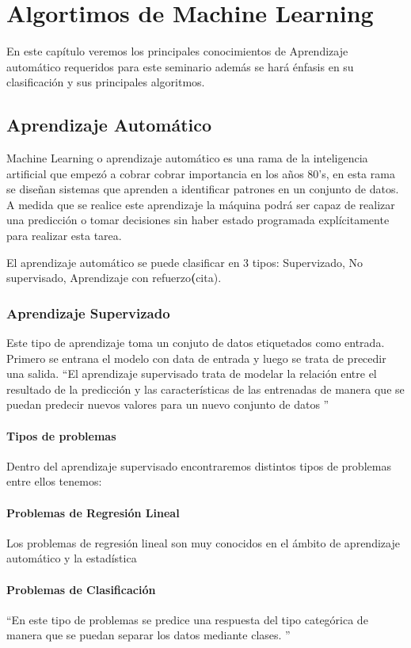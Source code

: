 \chapter{Algortimos de Machine Learning}

En este capítulo veremos los principales conocimientos de Aprendizaje automático requeridos para este seminario además se hará énfasis en su clasificación y sus principales algoritmos.

\section*{Aprendizaje Automático}
Machine Learning o aprendizaje automático es una rama de la inteligencia artificial que empezó a cobrar cobrar importancia en los años 80's, en esta rama se diseñan sistemas que aprenden a identificar patrones en un conjunto de datos. A medida que se realice este aprendizaje la máquina podrá ser capaz de realizar una predicción o tomar decisiones sin haber estado programada explícitamente para realizar esta tarea.


El aprendizaje automático se puede clasificar en 3 tipos: Supervizado, No supervisado, Aprendizaje con refuerzo\textbf(cita).
\subsection*{Aprendizaje Supervizado}
Este tipo de aprendizaje toma un conjuto de datos etiquetados como entrada. Primero se entrana el modelo con data de entrada y luego se trata de precedir  una salida. \textquotedblleft El aprendizaje supervisado trata de modelar la relación entre el resultado de la predicción y las características de las entrenadas de manera que se puedan predecir nuevos valores para un nuevo conjunto de datos \textquotedblright \cite{WEBSITE:1}
\subsubsection*{Tipos de problemas}
Dentro del aprendizaje supervisado encontraremos distintos tipos de problemas entre ellos tenemos:
\subsubsection*{Problemas de Regresión Lineal}
Los problemas de regresión lineal son muy conocidos en el ámbito de aprendizaje automático y la estadística 
\subsubsection*{Problemas de Clasificación}
\textquotedblleft En este tipo de problemas se predice una respuesta del tipo categórica de manera que se puedan separar los datos mediante clases. \textquotedblright \cite{WEBSITE:2}

